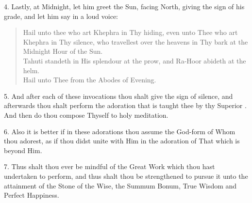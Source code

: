 4. Lastly, at Midnight, let him greet the Sun, facing North, giving the sign of his grade, and let him say in a loud voice:
\begin{verse}
Hail unto thee who art Khephra in Thy hiding, even unto Thee who art Khephra in Thy silence, who travellest over the heavens in Thy bark at the Midnight Hour of the Sun. \\
Tahuti standeth in His splendour at the prow, and Ra-Hoor abideth at the helm. \\
Hail unto Thee from the Abodes of Evening.
\end{verse}

5. And after each of these invocations thou shalt give the sign of silence, and afterwards thou shalt perform the adoration that is taught thee by thy Superior . And then do thou compose Thyself to holy meditation.

6. Also it is better if in these adorations thou assume the God-form of Whom thou adorest, as if thou didst unite with Him in the adoration of That which is beyond Him.

7. Thus shalt thou ever be mindful of the Great Work which thou hast undertaken to perform, and thus shalt thou be strengthened to pursue it unto the attainment of the Stone of the Wise, the Summum Bonum, True Wisdom and Perfect Happiness.
